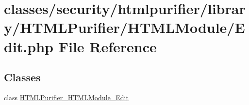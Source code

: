 \hypertarget{Edit_8php}{\section{classes/security/htmlpurifier/library/\+H\+T\+M\+L\+Purifier/\+H\+T\+M\+L\+Module/\+Edit.php File Reference}
\label{Edit_8php}
}
\subsection*{Classes}
\begin{DoxyCompactItemize}
\item 
class \hyperlink{classHTMLPurifier__HTMLModule__Edit}{H\+T\+M\+L\+Purifier\+\_\+\+H\+T\+M\+L\+Module\+\_\+\+Edit}
\end{DoxyCompactItemize}
